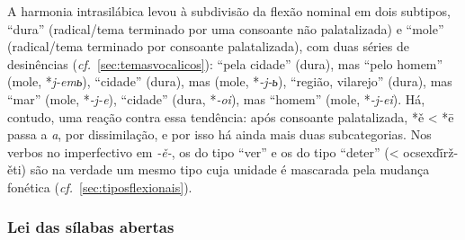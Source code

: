 A harmonia intrasilábica levou à subdivisão da flexão nominal em dois
subtipos, ``dura'' (radical/tema terminado por uma consoante não
palatalizada) e ``mole'' (radical/tema terminado por consoante
palatalizada), com duas séries de desinências (\emph{cf.}~\ref{sec:temasvocalicos}):
  ``pela cidade'' (dura), mas
 ``pelo homem'' (mole, *\emph{j-emь}),
  ``cidade'' (dura), mas
 (mole, *\emph{-j-ь}),  
``região, vilarejo'' (dura), mas  ``mar''
(mole, *\emph{-j-e}),   ``cidade''
(dura, *\emph{-oi}), mas  ``homem'' (mole,
*\emph{-j-ei}). Há, contudo, uma reação contra essa tendência: após
consoante palatalizada, *ě < *ē passa a \emph{a}, por
dissimilação, e por isso há ainda mais duas subcategorias. Nos verbos no
imperfectivo em \emph{-ě-}, os do tipo  ``ver'' e
os do tipo  ``deter''
(< ocsex{dī̆rž-ěti}) são na verdade um mesmo tipo cuja unidade é
mascarada pela mudança fonética (\emph{cf.}~\ref{sec:tiposflexionais}).

\subsubsection{Lei das sílabas abertas}\label{sec:silabasabertas}

